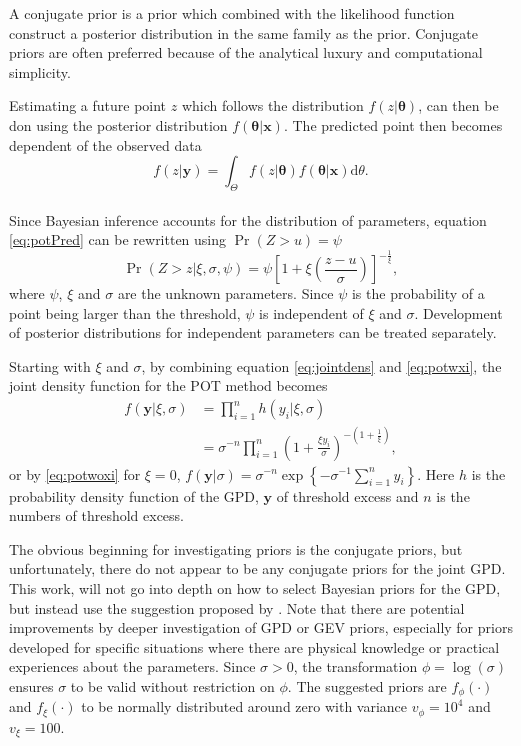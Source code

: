 A conjugate prior is a prior which combined with the likelihood function construct a posterior distribution in the same family as the prior.  Conjugate priors are often preferred because of the analytical luxury and computational simplicity.

Estimating a future point $z$ which follows the distribution $f(z|\boldsymbol{\theta})$, can then be don using the posterior distribution $f(\boldsymbol{\theta}|\boldsymbol{x})$. The predicted point then becomes dependent of the observed data
\begin{equation}
\label{eq:bayfuture}
f(z|\boldsymbol{y})={\int_{\Theta} f(z|\boldsymbol{\theta}) f(\boldsymbol{\theta}|\boldsymbol{x})\mathrm{d} \theta}.
\end{equation}
\\

Since Bayesian inference accounts for the distribution of parameters, equation \eqref{eq:potPred} can be rewritten using $\Pr(Z>u)=\psi$
\begin{equation}
\label{eq:potmcmc}
\Pr(Z>z|\xi,\sigma,\psi)=\psi \left[1+\xi \left( \frac{z-u}{\sigma}\right)\right]^{-\frac{1}{\xi}},
\end{equation}
where $\psi$, $\xi$ and $\sigma$ are the unknown parameters. Since $\psi$ is the probability of a point being larger than the threshold, $\psi$ is independent of $\xi$ and $\sigma$. Development of posterior distributions for independent parameters can be treated separately. 

Starting with $\xi$ and $\sigma$, by combining equation \eqref{eq:jointdens} and \eqref{eq:potwxi}, the joint density function for the POT method becomes
\begin{align}
f(\boldsymbol{y}|\xi,\sigma)&=\prod_{i=1}^{n} h(y_i|\xi,\sigma)\nonumber\\
&=\sigma^{-n} \prod_{i=1}^{n}\left( 1+\frac{\xi y_i}{\sigma}\right)^{-\left(1+\frac{1}{\xi}\right)}, \label{eq:jointdenspot}
\end{align}
or by \eqref{eq:potwoxi} for $\xi=0$, $f(\boldsymbol{y}|\sigma)=\sigma^{-n}\exp\left\{-\sigma^{-1} \sum_{i=1}^{n}y_i \right\}$.  Here $h$ is the probability density function of the GPD, $\boldsymbol{y}$ of threshold excess and $n$ is the numbers of threshold excess.

The obvious beginning for investigating priors is the conjugate priors, but unfortunately, there do not appear to be any conjugate priors for the joint GPD. This work, will not go into depth on how to select Bayesian priors for the GPD, but instead use the suggestion proposed by \cite[p.~174]{stuart}. Note that there are potential improvements by deeper investigation of GPD or GEV priors, especially for priors developed for specific situations where there are physical knowledge or practical experiences about the parameters. Since $\sigma>0$, the transformation $\phi=\log(\sigma)$ ensures $\sigma$ to be valid without restriction on $\phi$. The suggested priors are $f_{\phi}(\cdot)$ and $f_{\xi}(\cdot)$ to be normally distributed around zero with variance $v_{\phi}=10^4$ and $v_{\xi}=100$. 

